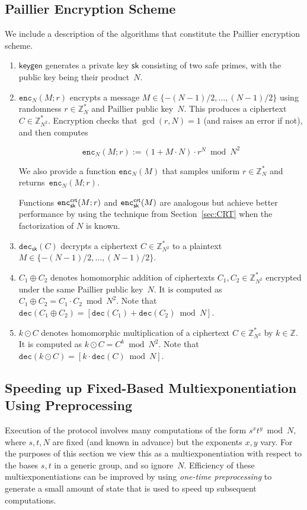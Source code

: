 \documentclass[11pt]{article}
\newcommand{\enc}{\ensuremath{\mathtt{enc}}}
\newcommand{\dec}{\ensuremath{\mathtt{dec}}}
\newcommand{\sk}{\textsf{sk}}
\newcommand{\Z}{\mathbb{Z}}
\newcommand{\?}[1]{\stackrel{?}{#1}}
\begin{document}
\subsection{Paillier Encryption Scheme}
We include a description of the algorithms that constitute the Paillier encryption scheme. 
\begin{enumerate}
    \item $\textsf{keygen}$ generates a private key $\sk$ consisting of two safe primes, with the public key being their product~$N$.
    
    
    \item 
    $\enc_N(M; r)$ 
    encrypts a message $M \in \{-(N-1)/2, \ldots,  (N-1)/2\}$ 
    using randomness $r \in \Z_N^*$ 
    and Paillier public key~$N$. 
    This produces a ciphertext $C \in \Z^*_{N^2}$.
    Encryption checks that $\gcd(r, N)=1$ (and raises an error if not), and then computes
    
    $$\enc_N(M; r) := (1 + M \cdot N) \cdot r^N \bmod N^2$$ 

        We also provide a function $\enc_N(M)$ that samples uniform $r \in \Z_N^*$ and returns~$\enc_N(M; r)$.

    Functions $\enc^{{\sf crt}}_{\sk}(M;r)$ and $\enc^{{\sf crt}}_{\sk}(M)$ are analogous but achieve better performance by using the technique from Section~\ref{sec:CRT} when the factorization of $N$
    is known.

    \item $\dec_{\sk}(C)$ decrypts a ciphertext $C \in \Z^*_{N^2}$ to a plaintext $M \in \{-(N-1)/2, \ldots,  (N-1)/2\}$.

    \item $C_1 \oplus C_2$ denotes homomorphic addition of ciphertexts $C_1, C_2 \in \Z^*_{N^2}$ encrypted under the same Paillier public key~$N$. It is computed as $C_1 \oplus C_2 = C_1 \cdot C_2 \bmod N^2$. Note that 
$\dec(C_1 \oplus C_2) = [\dec(C_1) + \dec(C_2) \bmod N]$. 

    

    \item $k \odot C$ denotes homomorphic multiplication of a ciphertext $C \in \Z^*_{N^2}$ by $k \in \Z$. It is computed as $k \odot C = C^k \bmod N^2$. Note that $\dec(k \odot C) = [k \cdot \dec(C) \bmod N]$.

    
\end{enumerate}

\subsection{Speeding up Fixed-Based Multiexponentiation Using Preprocessing}
\label{sec:multiexp}
Execution of the protocol involves many computations of the form $s^x t^y \bmod N$, where $s, t, N$ are fixed (and known in advance) but the exponents $x, y$ vary. 
For the purposes of this section we view this as a multiexponentiation with respect to the bases $s, t$ in a generic group, and so ignore~$N$.
Efficiency of these multiexponentiations can be improved by using \emph{one-time preprocessing} to generate a small amount of state that is used to speed up subsequent computations.
\end{document}
